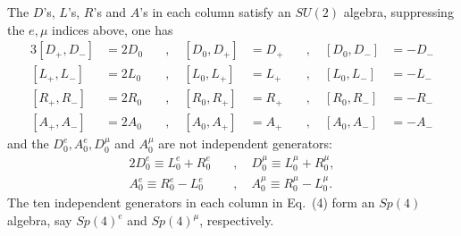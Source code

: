 \documentclass[a4paper,12pt]{article}
\begin{document}
The $D$'s, $L$'s, $R$'s and $A$'s in each column satisfy an $SU(2)$ algebra, 
suppressing the $e, \mu$ indices above, one has
\begin{alignat}{3}
[D_{+},D_{-}]&=2D_{0} & \quad, \quad [D_{0},D_{+}]&=D_{+} & \quad, \quad
[D_{0},D_{-}]&=-D_{-}  \\[0.2cm]
[L_{+},L_{-}]&=2L_{0} & \quad, \quad [L_{0},L_{+}]&=L_{+} & \quad, \quad 
[L_{0},L_{-}]&=-L_{-} \\[0.2cm]
[R_{+},R_{-}]&=2R_{0} & \quad, \quad [R_{0},R_{+}]&=R_{+} & \quad, \quad 
[R_{0},R_{-}]&=-R_{-}  \\[0.2cm]
[A_{+},A_{-}]&=2A_{0} & \quad, \quad [A_{0},A_{+}]&=A_{+} & \quad, \quad 
[A_{0},A_{-}]&=-A_{-}
\end{alignat}
and the $D_{0}^{e},A_{0}^{e},D_{0}^{\mu }$ and $A_{0}^{\mu }$ are not 
independent generators:
\begin{alignat}{2}
D_{0}^{e}\equiv L_{0}^{e}+R_{0}^{e} & \quad, \quad D_{0}^{\mu }\equiv L_{0}
^{\mu}+R_{0}^{\mu },\nonumber  \\[0.2cm] 
A_{0}^{e}\equiv R_{0}^{e}-L_{0}^{e} & \quad, \quad A_{0}^{\mu }
\equiv R_{0}^{\mu}-L_{0}^{\mu }.
\end{alignat}
The ten independent generators in each column in Eq.~(4) form an $Sp(4)$ 
algebra, 
say $Sp(4)^e$ and $Sp(4)^\mu$, respectively.
\end{document}
